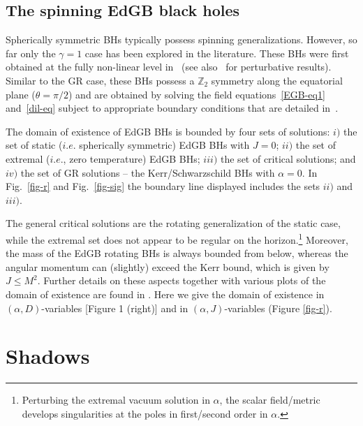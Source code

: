 \documentclass[12pt]{article}
\begin{document}
 \subsection{The spinning EdGB black holes}
{Spherically symmetric BHs typically possess spinning
generalizations}.
However, so far only the $\gamma=1$
case has been explored in the literature.
These BHs
 were first obtained at the 
fully non-linear  level
in~\cite{Kleihaus:2011tg}
(see also~\cite{Pani:2009wy,Pani:2011gy, Ayzenberg:2014aka, Maselli:2015tta} 
for perturbative results). 
 Similar to the GR case,
these BHs possess a $\mathbb{Z}_2$ symmetry along the equatorial plane ($\theta=\pi/2$) 
and are obtained by solving  the field equations~\eqref{EGB-eq1} and~\eqref{dil-eq} 
subject to appropriate boundary conditions that are detailed in~\cite{Kleihaus:2015aje}.



The domain of existence of EdGB  BHs is bounded by four sets of solutions:  
$i)$ the set of static ($i.e.$ spherically symmetric) EdGB BHs with $J=0$;
$ii)$ the set of extremal ($i.e.$, zero temperature) EdGB BHs;
$iii)$ the set of critical solutions;
 and $iv)$ the set of GR solutions -- the Kerr/Schwarzschild BHs with $\alpha=0$. In Fig.~\ref{fig-r} and Fig.~\ref{fig-sig} the boundary line displayed includes the sets $ii)$ and $iii)$. 

The general critical solutions are the rotating generalization of the static case, while the extremal set does not appear to be regular on the horizon.\footnote{Perturbing the extremal vacuum solution in $\alpha$, the scalar field/metric develops singularities at the poles in first/second order in $\alpha$.}
Moreover, the mass of the EdGB rotating BHs is always bounded from below, whereas the angular momentum can (slightly) exceed the Kerr bound, which is given by {$J \leqslant M^2$}.
Further details on these aspects together with various plots of the domain of existence are found in 
\cite{Kleihaus:2015aje}.
Here we give the domain of existence in $(\alpha,D)$-variables [Figure 1 (right)]
and in  $(\alpha,J)$-variables
 (Figure  \ref{fig-r}). 


\section{Shadows}
\label{section_shadows}
\end{document}
